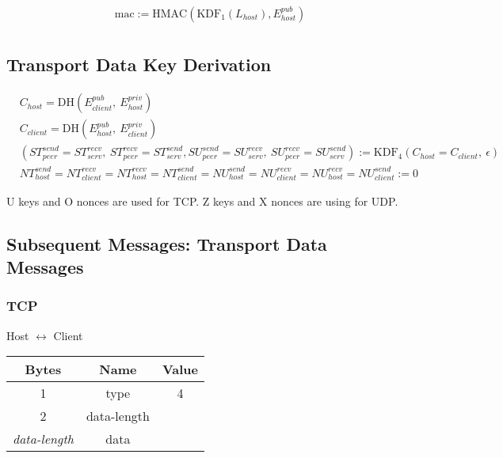\begin{align*}
    & \text{mac} := \text{HMAC}(\text{KDF}_1(L_{host}), E_{host}^{pub})\\
\end{align*}

\subsection{Transport Data Key Derivation}

\begin{align*}
    & C_{host} = \text{DH}(E_{client}^{pub},\ E_{host}^{priv})\\
    & C_{client} = \text{DH}(E_{host}^{pub},\ E_{client}^{priv})\\
    & (\mathit{ST}_{peer}^{send} = \mathit{ST}_{serv}^{recv},\ \mathit{ST}_{peer}^{recv} = \mathit{ST}_{serv}^{send}, \mathit{SU}_{peer}^{send} = \mathit{SU}_{serv}^{recv},\ \mathit{SU}_{peer}^{recv} = \mathit{SU}_{serv}^{send}) := \text{KDF}_4(C_{host} = C_{client},
    \ \epsilon) \\
    & \mathit{NT}_{host}^{send} = \mathit{NT}_{client}^{recv} = \mathit{NT}_{host}^{recv} = \mathit{NT}_{client}^{send} = \mathit{NU}_{host}^{send} = \mathit{NU}_{client}^{recv} = \mathit{NU}_{host}^{recv} = \mathit{NU}_{client}^{send} := 0
\end{align*}

U keys and O nonces are used for TCP. Z keys and X nonces are using for UDP.

\subsection{Subsequent Messages: Transport Data Messages}

\subsubsection{TCP}

\begin{center}
    Host $\leftrightarrow$ Client\\
    \begin{tabular}{|c|c|c|}
        \hline
        \textbf{Bytes}     & \textbf{Name} & \textbf{Value} \\
        \hline
        1                  & type          & 4              \\
        \hline
        2                  & data-length   &                \\
        \hline
        \emph{data-length} & data          &                \\
        \hline
    \end{tabular}
\end{center}

